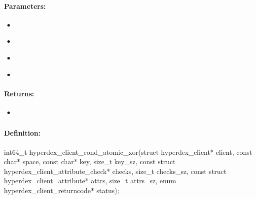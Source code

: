 \paragraph{Parameters:}
\begin{itemize}[noitemsep]
\item {}\\

\item {}\\

\item {}\\

\item {}\\

\end{itemize}

\paragraph{Returns:}
\begin{itemize}[noitemsep]
\item {}\\

\end{itemize}

\pagebreak
\subsubsection{}
\label{api:c:cond_atomic_xor}


\paragraph{Definition:}
\begin{ccode}
int64_t hyperdex_client_cond_atomic_xor(struct hyperdex_client* client,
        const char* space,
        const char* key, size_t key_sz,
        const struct hyperdex_client_attribute_check* checks, size_t checks_sz,
        const struct hyperdex_client_attribute* attrs, size_t attrs_sz,
        enum hyperdex_client_returncode* status);
\end{ccode}

